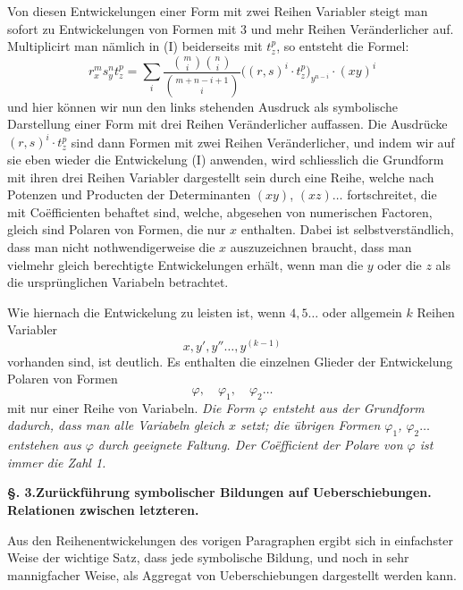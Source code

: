 \documentclass[10pt]{article}
\begin{document}
Von diesen Entwickelungen einer Form mit zwei Reihen Variabler steigt man sofort zu Entwickelungen von Formen mit 3 und mehr Reihen Veränderlicher auf. Multiplicirt man nämlich in (I) beiderseits mit $t_z^p$, so entsteht die Formel:
\[
r_x^m s_y^n t_z^p
=\sum_i \frac{\binom{m}{i}\binom{n}{i}}{\binom{m+n-i+1}{i}}\bigl((r,s)^i\cdot t_z^p\bigr)_{y^{n-i}}\cdot(xy)^i
\]
und hier können wir nun den links stehenden Ausdruck als symbolische Darstellung einer Form mit drei Reihen Veränderlicher auffassen. Die Ausdrücke $(r,s)^i\cdot t_z^p$ sind dann Formen mit zwei Reihen Veränderlicher, und indem wir auf sie eben wieder die Entwickelung (I) anwenden, wird schliesslich die Grundform mit ihren drei Reihen Variabler dargestellt sein durch eine Reihe, welche nach Potenzen und Producten der Determinanten $(xy)$, $(xz)\ldots$ fortschreitet, die mit Coëfficienten behaftet sind, welche, abgesehen von numerischen Factoren, gleich sind Polaren von Formen, die nur $x$ enthalten. Dabei ist selbstverständlich, dass man nicht nothwendigerweise die $x$ auszuzeichnen braucht, dass man vielmehr gleich berechtigte Entwickelungen erhält, wenn man die $y$ oder die $z$ als die ursprünglichen Variabeln betrachtet.

Wie hiernach die Entwickelung zu leisten ist, wenn $4,5\ldots$ oder allgemein $k$ Reihen Variabler
\[
x,y',y''\ldots,y^{(k-1)}
\]
vorhanden sind, ist deutlich. Es enthalten die einzelnen Glieder der Entwickelung Polaren von Formen
\[
\varphi,\quad \varphi_1,\quad \varphi_2\ldots
\]
mit nur einer Reihe von Variabeln. \emph{Die Form $\varphi$ entsteht aus der Grundform dadurch, dass man alle Variabeln gleich $x$ setzt; die übrigen Formen $\varphi_1$, $\varphi_2\ldots$ entstehen aus $\varphi$ durch geeignete Faltung. Der Coëfficient der Polare von $\varphi$ ist immer die Zahl 1.}

\begin{center}
{\bfseries §. 3.\quad Zurückführung symbolischer Bildungen auf Ueberschiebungen.\\ Relationen zwischen letzteren.}
\end{center}

Aus den Reihenentwickelungen des vorigen Paragraphen ergibt sich in einfachster Weise der wichtige Satz, dass jede symbolische Bildung, und noch in sehr mannigfacher Weise, als Aggregat von Ueberschiebungen dargestellt werden kann.
\end{document}
